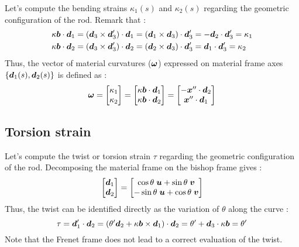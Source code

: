Let’s compute the bending strains $\kappa_1(s)$ and $\kappa_2(s)$ regarding the geometric configuration of the rod. Remark that :
\begin{equation}
	\begin{aligned}
	&\kappa\boldsymbol{b}\cdot\boldsymbol{d}_1 = (\boldsymbol{d}_3\times\boldsymbol{d}'_3)\cdot\boldsymbol{d}_1 = (\boldsymbol{d}_1\times\boldsymbol{d}_3)\cdot\boldsymbol{d}'_3 = -\boldsymbol{d}_2\cdot\boldsymbol{d}'_3 = \kappa_1 \\
	&\kappa\boldsymbol{b}\cdot\boldsymbol{d}_2 = (\boldsymbol{d}_3\times\boldsymbol{d}'_3)\cdot\boldsymbol{d}_2 = (\boldsymbol{d}_2\times\boldsymbol{d}_3)\cdot\boldsymbol{d}'_3 = \boldsymbol{d}_1\cdot\boldsymbol{d}'_3 = \kappa_2	
	\end{aligned}
\end{equation}
Thus, the vector of material curvatures ($\boldsymbol{\omega}$) expressed on material frame axes $\{\boldsymbol{d}_1(s),\boldsymbol{d}_2(s)\}$ is defined as :
\begin{equation}
	\boldsymbol{\omega} =
	\begin{bmatrix}
		\kappa_1\\
		\kappa_2\\
	\end{bmatrix} =
	\begin{bmatrix}
		\kappa\boldsymbol{b}\cdot\boldsymbol{d}_1\\
		\kappa\boldsymbol{b}\cdot\boldsymbol{d}_2\\
	\end{bmatrix} =
		\begin{bmatrix}
		-\boldsymbol{x}''\cdot\boldsymbol{d}_2\\
		\boldsymbol{x}''\cdot\boldsymbol{d}_1\\
	\end{bmatrix}
\end{equation}

\subsection{Torsion strain}
Let’s compute the twist or torsion strain $\tau$ regarding the geometric configuration of the rod. Decomposing the material frame on the bishop frame gives :
\begin{equation}
	\begin{bmatrix}
		\boldsymbol{d}_1\\
		\boldsymbol{d}_2\\
	\end{bmatrix} =
		\begin{bmatrix}
		\cos{\theta}\;\boldsymbol{u} + \sin{\theta}\;\boldsymbol{v}\\
		-\sin{\theta}\;\boldsymbol{u} + \cos{\theta}\;\boldsymbol{v}\\
	\end{bmatrix}
\end{equation}
Thus, the twist can be identified directly as the variation of $\theta$ along the curve :
\begin{equation}
	\tau = \boldsymbol{d}'_1 \cdot \boldsymbol{d}_2 = (\theta'\boldsymbol{d}_2 + \kappa\boldsymbol{b}\times\boldsymbol{d}_1)\cdot \boldsymbol{d}_2 = \theta' + \boldsymbol{d}_3\cdot\kappa\boldsymbol{b} = \theta'
\end{equation}
Note that the Frenet frame does not lead to a correct evaluation of the twist.


